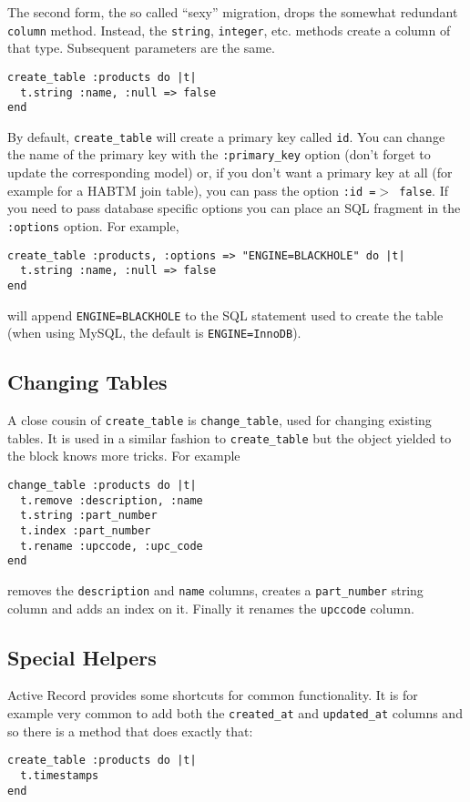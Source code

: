 \documentclass[10pt]{book}
\begin{document}
The second form, the so called “sexy” migration, drops the somewhat redundant \texttt{column} method. Instead, the \texttt{string}, \texttt{integer}, etc. methods create a column of that type. Subsequent parameters are the same.
\begin{verbatim}
create_table :products do |t|
  t.string :name, :null => false
end
\end{verbatim}


By default, \texttt{create\_table} will create a primary key called \texttt{id}. You can change the name of the primary key with the \texttt{:primary\_key} option (don’t forget to update the corresponding model) or, if you don’t want a primary key at all (for example for a HABTM join table), you can pass the option \texttt{:id =$>$ false}. If you need to pass database specific options you can place an SQL fragment in the \texttt{:options} option. For example,
\begin{verbatim}
create_table :products, :options => "ENGINE=BLACKHOLE" do |t|
  t.string :name, :null => false
end
\end{verbatim}

will append \texttt{ENGINE=BLACKHOLE} to the SQL statement used to create the table (when using MySQL, the default is \texttt{ENGINE=InnoDB}).

\subsection{ Changing Tables}

A close cousin of \texttt{create\_table} is \texttt{change\_table}, used for changing existing tables. It is used in a similar fashion to \texttt{create\_table} but the object yielded to the block knows more tricks. For example
\begin{verbatim}
change_table :products do |t|
  t.remove :description, :name
  t.string :part_number
  t.index :part_number
  t.rename :upccode, :upc_code
end
\end{verbatim}

removes the \texttt{description} and \texttt{name} columns, creates a \texttt{part\_number} string column and adds an index on it. Finally it renames the \texttt{upccode} column.

\subsection{ Special Helpers}

Active Record provides some shortcuts for common functionality. It is for example very common to add both the \texttt{created\_at} and \texttt{updated\_at} columns and so there is a method that does exactly that:
\begin{verbatim}
create_table :products do |t|
  t.timestamps
end
\end{verbatim}
\end{document}

